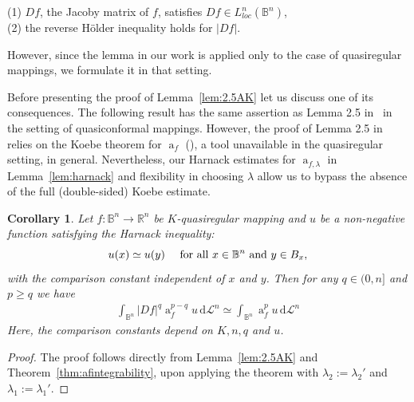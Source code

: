 \documentclass[11pt,a4paper,reqno]{amsart}
\newtheorem{cor}[theorem]{Corollary}
\theoremstyle{definition}
\renewcommand{\a}{\operatorname{a}}
\newcommand{\B}{\mathbb{B}^n}
\newcommand{\R}{\mathbb{R}}
\newcommand{\Leb}{\mathrm {d}{\mathcal L}^{n}}
\numberwithin{komcounter}{section}
\begin{document}
\noindent (1) $Df$, the Jacoby matrix of $f$, satisfies ${D\!f \in L^n_{loc}(\B)}$,\\
(2) the reverse H\"older inequality holds for $|Df|$.
\smallskip

However, since the lemma in our work is applied only to the case of quasiregular mappings, we formulate it in that setting.

Before presenting the proof of Lemma~\ref{lem:2.5AK} let us discuss one of its consequences. The following 
result has the same assertion as Lemma 2.5 in~\cite{ak} in the setting of quasiconformal mappings. However, the proof of  Lemma 2.5 in~\cite{ak} relies on the Koebe theorem for $\a_f$ (\cite[Lemma 2.3]{ak}), a tool unavailable in the quasiregular setting, in general. Nevertheless, our Harnack estimates for $\a_{f,\lambda}$ in Lemma~\ref{lem:harnack} and flexibility in choosing $\lambda$ allow us to bypass the absence of the full (double-sided) Koebe estimate.

\begin{cor}\label{cor:lem32}
Let $f:\B\rightarrow \R^n$ be $K$-quasiregular mapping and $u$ be a non-negative function satisfying the Harnack inequality:
		\[
		u(x)\simeq u(y)\quad \hbox{ for all } x\in\B \hbox{ and }y\in B_x,
		\]  
		with the comparison constant independent of $x$ and $y$.  
		Then for any $q\in (0,n]$ and $p\geq q$ we have
		\begin{align*}
			\int_{\B}|Df|^q\a_{f}^{p-q}u\, \Leb\simeq \int_{\B}\a_{f}^pu\, \Leb
		\end{align*}
		Here, the comparison constants depend on $K,n,q$ and $u$. 
\end{cor}
\begin{proof} The proof follows directly from Lemma~\ref{lem:2.5AK} and Theorem~\ref{thm:afintegrability}, upon
applying the theorem with $\lambda_2:=\lambda_2'$ and $\lambda_1:=\lambda_1'$.
\end{proof}
\end{document}
